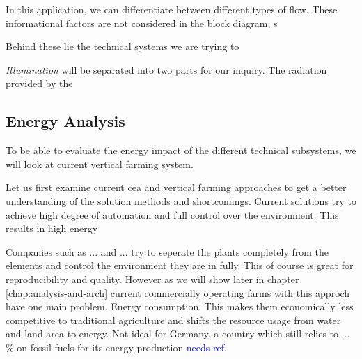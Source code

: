 In this application, we can differentiate between different types of flow.
These informational factors are not considered in the block diagram, s

Behind these lie the technical systems we are trying to 

\textit{Illumination} will be separated into two parts for our inquiry.
The radiation provided by the 


\subsection{Energy Analysis}
\label{sub:energy-analysis}
To be able to evaluate the energy impact of the different technical subsystems, we will look at current vertical farming system.

Let us first examine current \ac{cea} and vertical farming approaches to get a better understanding of the solution methods and shortcomings.
Current solutions try to achieve high degree of automation and full control over the environment.
This results in high energy

Companies such as ... and ... try to seperate the plants completely from the elements and control the environment they are in fully.
This of course is great for reproducibility and quality.
However as we will show later in chapter \ref{chap:analysis-and-arch} current commercially operating farms with this approch have one main problem.
Energy consumption.
This makes them economically less competitive to traditional agriculture and shifts the resource usage from water and land area to energy.
Not ideal for Germany, a country which still relies to ... \% on fossil fuels for its energy production \textcolor{blue}{needs ref}.

